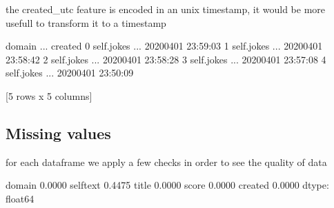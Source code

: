 \documentclass[letterpaper,10pt,english]{jupyterBook}
\begin{document}
\sphinxAtStartPar
the created\_utc feature is encoded in an unix timestamp, it would be more usefull to transform it to a timestamp

\begin{sphinxVerbatim}[commandchars=\\\{\}]
\PYG{p}{[}\PYG{p}{]}  \PYG{p}{[}\PYG{p}{]} 
 \PYG{p}{[}\PYG{p}{]}
\end{sphinxVerbatim}

\begin{sphinxVerbatim}[commandchars=\\\{\}]
       domain  ...             created
0  self.jokes  ... 2020\PYGZhy{}04\PYGZhy{}01 23:59:03
1  self.jokes  ... 2020\PYGZhy{}04\PYGZhy{}01 23:58:42
2  self.jokes  ... 2020\PYGZhy{}04\PYGZhy{}01 23:58:28
3  self.jokes  ... 2020\PYGZhy{}04\PYGZhy{}01 23:57:08
4  self.jokes  ... 2020\PYGZhy{}04\PYGZhy{}01 23:50:09

[5 rows x 5 columns]
\end{sphinxVerbatim}


\subsection{Missing values}
\label{\detokenize{c7_case_studies/Jokes:missing-values}}
\sphinxAtStartPar
for each dataframe we apply a few checks in order to see the quality of data

\begin{sphinxVerbatim}[commandchars=\\\{\}]
\PYG{p}{[}\PYG{p}{]}
\end{sphinxVerbatim}

\begin{sphinxVerbatim}[commandchars=\\\{\}]
domain      0.0000
selftext    0.4475
title       0.0000
score       0.0000
created     0.0000
dtype: float64
\end{sphinxVerbatim}
\end{document}
